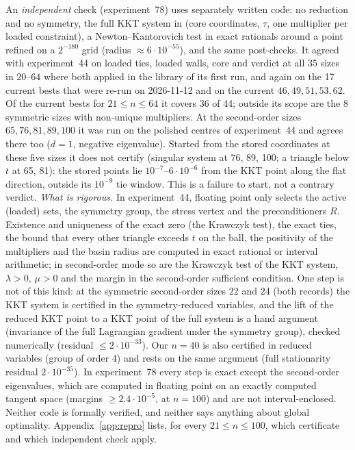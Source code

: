 \documentclass[11pt]{amsart}
\theoremstyle{definition}
\begin{document}
An \emph{independent} check (experiment~78) uses separately written code: no reduction and no symmetry, the full KKT system in (core coordinates, $\tau$, one multiplier per loaded constraint), a Newton--Kantorovich test in exact rationals around a point refined on a $2^{-180}$ grid (radius $\approx 6\cdot10^{-55}$), and the same post-checks. It agreed with experiment~44 on loaded ties, loaded walls, core and verdict at all 35 sizes in $20$--$64$ where both applied in the library of its first run, and again on the 17 current bests that were re-run on 2026-11-12 and on the current $46, 49, 51, 53, 62$. Of the current bests for $21 \le n \le 64$ it covers 36 of 44; outside its scope are the 8 symmetric sizes with non-unique multipliers. At the second-order sizes $65, 76, 81, 89, 100$ it was run on the polished centres of experiment~44 and agrees there too ($d = 1$, negative eigenvalue). Started from the stored coordinates at these five sizes it does not certify (singular system at 76, 89, 100; a triangle below $t$ at 65, 81): the stored points lie $10^{-7}$--$6\cdot10^{-6}$ from the KKT point along the flat direction, outside its $10^{-9}$ tie window. This is a failure to start, not a contrary verdict. %
\emph{What is rigorous.} In experiment~44, floating point only selects the active (loaded) sets, the symmetry group, the stress vertex and the preconditioners $R$. Existence and uniqueness of the exact zero (the Krawczyk test), the exact ties, the bound that every other triangle exceeds $t$ on the ball, the positivity of the multipliers and the basin radius are computed in exact rational or interval arithmetic; in second-order mode so are the Krawczyk test of the KKT system, $\lambda > 0$, $\mu > 0$ and the margin in the second-order sufficient condition. One step is not of this kind: at the symmetric second-order sizes $22$ and $24$ (both records) the KKT system is certified in the symmetry-reduced variables, and the lift of the reduced KKT point to a KKT point of the full system is a hand argument (invariance of the full Lagrangian gradient under the symmetry group), checked numerically (residual $\le 2\cdot10^{-33}$). Our $n = 40$ is also certified in reduced variables (group of order 4) and rests on the same argument (full stationarity residual $2\cdot10^{-35}$). %
In experiment~78 every step is exact except the second-order eigenvalues, which are computed in floating point on an exactly computed tangent space (margins $\ge 2.4\cdot10^{-5}$, at $n = 100$) and are not interval-enclosed. %
Neither code is formally verified, and neither says anything about global optimality. Appendix~\ref{app:repro} lists, for every $21 \le n \le 100$, which certificate and which independent check apply.
\end{document}
